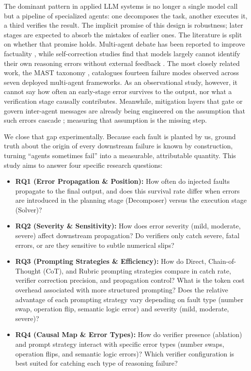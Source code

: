 \documentclass{article}
\begin{document}
The dominant pattern in applied LLM systems is no longer a single model call
but a pipeline of specialized agents: one decomposes the task, another
executes it, a third verifies the result. The implicit promise of this design
is robustness; later stages are expected to absorb the mistakes of earlier
ones. The literature is split on whether that promise holds. Multi-agent
debate has been reported to improve factuality \citep{du2023debate}, while
self-correction studies find that models largely cannot identify their own
reasoning errors without external feedback \citep{huang2023selfcorrect}. The
most closely related work, the MAST taxonomy \citep{cemri2025mast},
catalogues fourteen failure modes observed across seven deployed multi-agent
frameworks. As an observational study, however, it cannot say how often an
early-stage error survives to the output, nor what a verification stage
causally contributes. Meanwhile, mitigation layers that gate or govern
inter-agent messages are already being engineered on the assumption that such
errors cascade \citep{yoffe2024debunc, xie2026spark}; measuring that
assumption is the missing step.

We close that gap experimentally. Because each fault is planted by us, ground
truth about the origin of every downstream failure is known by construction,
turning ``agents sometimes fail'' into a measurable, attributable quantity.
This study aims to answer four specific research questions:
\begin{itemize}
    \item \textbf{RQ1 (Error Propagation \& Position):} How often do injected
    faults propagate to the final output, and does this survival rate differ when
    errors are introduced in the planning stage (Decomposer) versus the execution
    stage (Solver)?
    \item \textbf{RQ2 (Severity \& Sensitivity):} How does error severity
    (mild, moderate, severe) affect downstream propagation? Do verifiers only
    catch severe, fatal errors, or are they sensitive to subtle numerical slips?
    \item \textbf{RQ3 (Prompting Strategies \& Efficiency):} How do Direct,
    Chain-of-Thought (CoT), and Rubric prompting strategies compare in catch rate,
    verifier correction precision, and propagation control? What is the token cost
    overhead associated with more structured prompting? Does the relative advantage
    of each prompting strategy vary depending on fault type (number swap, operation
    flip, semantic logic error) and severity (mild, moderate, severe)?
    \item \textbf{RQ4 (Causal Map \& Error Types):} How do verifier presence
    (ablation) and prompt strategy interact with specific error types (number swaps,
    operation flips, and semantic logic errors)? Which verifier configuration is
    best suited for catching each type of reasoning failure?
\end{itemize}
\end{document}

